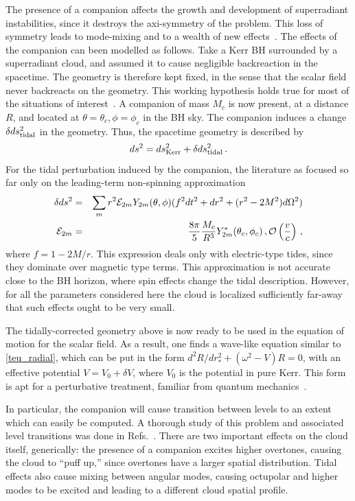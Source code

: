 \documentclass[11pt]{article}
\newcommand{\be}{\begin{equation}}
\newcommand{\ee}{\end{equation}}
\def\beq{\begin{eqnarray}}
\def\eeq{\end{eqnarray}}
\numberwithin{equation}{section} %
\begin{document}
%
The presence of a companion affects the growth and development of superradiant instabilities,
since it destroys the axi-symmetry of the problem. This loss of symmetry leads to mode-mixing
and to a wealth of new effects~\cite{Baumann:2018vus}. The effects of the companion can been modelled as follows.
Take a Kerr BH surrounded by a superradiant cloud, and assumed it to cause negligible backreaction in the spacetime. The 
geometry is therefore kept fixed, in the sense that the scalar field never backreacts on the geometry. This working 
hypothesis holds true for most of the situations of interest~\cite{Brito:2014wla}. A companion of mass $M_c$ is now 
present, at a distance $R$, and located at $\theta=\theta_c,\phi=\phi_c$ in the BH sky. The companion induces a change 
$\delta ds_{\rm tidal}^2$ in the geometry. Thus, the spacetime geometry is described by
%
\be
ds^2=ds^2_{\rm Kerr}+\delta ds_{\rm tidal}^2\,.
\ee
%
For the tidal perturbation induced by the companion, the literature as focused so far only on the leading-term 
non-spinning approximation~\cite{Cardoso:2017cfl}
%
\beq
\delta ds^2&=&\sum_m r^2{\cal E}_{2m}Y_{2m}(\theta,\phi)(f^2dt^2+dr^2+(r^2-2M^2)d\Omega^2)\nonumber\\
%
{\cal E}_{2m}&=&\frac{8\pi}{5}\frac{M_c}{R^3}Y^*_{2m}(\theta_c,\phi_c)\,,%
\mathcal{O}\left(\frac{v}{c}\right) \, ,
\eeq
%
where $f=1-2M/r$. This expression deals only with electric-type tides, since they dominate over magnetic type terms.
%
This approximation is not accurate close to the BH horizon, where spin effects change the tidal description. However, 
for all the parameters considered here the cloud is localized sufficiently far-away that such effects ought to be very 
small.



The tidally-corrected geometry above is now ready to be used in the equation of motion for the scalar field. As a 
result, one finds a wave-like equation similar to \eqref{teu_radial}, which can be put in the form 
$d^2R/dr_*^2+\left(\omega^2-V\right)R=0$,
with an effective potential $V=V_0+\delta V$, where $V_0$ is the potential in pure Kerr. This form is apt for a 
perturbative treatment, familiar from quantum mechanics~\cite{Landau:QM}. 


In particular, the companion will cause transition between levels to an extent which can easily be computed. A thorough 
study of this problem and associated level transitions was done in Refs.~\cite{Baumann:2018vus,Berti:2019wnn,Cardoso:2020hca}.
There are two important effects on the cloud itself, generically: the presence of a companion excites higher overtones, 
causing the cloud to ``puff up,'' since overtones have a larger spatial distribution. Tidal effects also cause mixing 
between angular modes, causing octupolar and higher modes to be excited and leading to a different cloud spatial 
profile.
\end{document}
